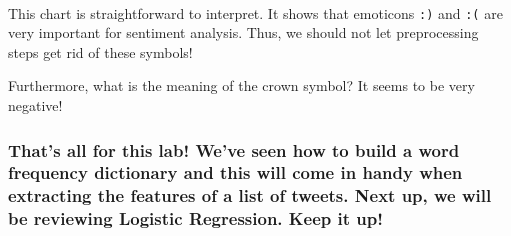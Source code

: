 \documentclass[11pt]{article}
\begin{document}
    \begin{center}
    \end{center}
    { \hspace*{\fill} \\}
    
    This chart is straightforward to interpret. It shows that emoticons
\texttt{:)} and \texttt{:(} are very important for sentiment analysis.
Thus, we should not let preprocessing steps get rid of these symbols!

Furthermore, what is the meaning of the crown symbol? It seems to be
very negative!

    \hypertarget{thats-all-for-this-lab-weve-seen-how-to-build-a-word-frequency-dictionary-and-this-will-come-in-handy-when-extracting-the-features-of-a-list-of-tweets.-next-up-we-will-be-reviewing-logistic-regression.-keep-it-up}{%
\subsubsection{That's all for this lab! We've seen how to build a word
frequency dictionary and this will come in handy when extracting the
features of a list of tweets. Next up, we will be reviewing Logistic
Regression. Keep it
up!}\label{thats-all-for-this-lab-weve-seen-how-to-build-a-word-frequency-dictionary-and-this-will-come-in-handy-when-extracting-the-features-of-a-list-of-tweets.-next-up-we-will-be-reviewing-logistic-regression.-keep-it-up}}


    
    
    
\end{document}
